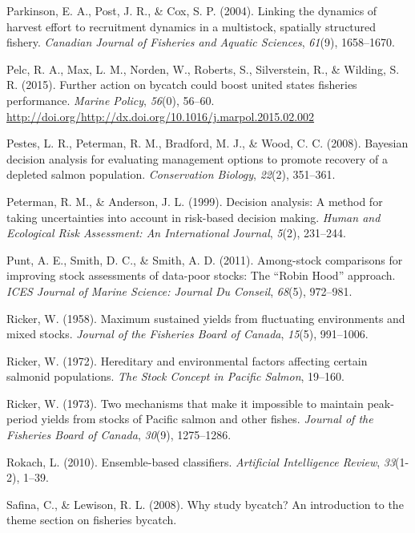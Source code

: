 \documentclass[12pt,]{scrartcl}
\begin{document}
\hypertarget{ref-parkinson2004linking}{}
Parkinson, E. A., Post, J. R., \& Cox, S. P. (2004). Linking the
dynamics of harvest effort to recruitment dynamics in a multistock,
spatially structured fishery. \emph{Canadian Journal of Fisheries and
Aquatic Sciences}, \emph{61}(9), 1658--1670.

\hypertarget{ref-Pelc201556}{}
Pelc, R. A., Max, L. M., Norden, W., Roberts, S., Silverstein, R., \&
Wilding, S. R. (2015). Further action on bycatch could boost united
states fisheries performance. \emph{Marine Policy}, \emph{56}(0),
56--60.
\url{http://doi.org/http://dx.doi.org/10.1016/j.marpol.2015.02.002}

\hypertarget{ref-pestes2008bayesian}{}
Pestes, L. R., Peterman, R. M., Bradford, M. J., \& Wood, C. C. (2008).
Bayesian decision analysis for evaluating management options to promote
recovery of a depleted salmon population. \emph{Conservation Biology},
\emph{22}(2), 351--361.

\hypertarget{ref-peterman1999decision}{}
Peterman, R. M., \& Anderson, J. L. (1999). Decision analysis: A method
for taking uncertainties into account in risk-based decision making.
\emph{Human and Ecological Risk Assessment: An International Journal},
\emph{5}(2), 231--244.

\hypertarget{ref-punt2011among}{}
Punt, A. E., Smith, D. C., \& Smith, A. D. (2011). Among-stock
comparisons for improving stock assessments of data-poor stocks: The
``Robin Hood'' approach. \emph{ICES Journal of Marine Science: Journal
Du Conseil}, \emph{68}(5), 972--981.

\hypertarget{ref-ricker1958maximum}{}
Ricker, W. (1958). Maximum sustained yields from fluctuating
environments and mixed stocks. \emph{Journal of the Fisheries Board of
Canada}, \emph{15}(5), 991--1006.

\hypertarget{ref-ricker1972hereditary}{}
Ricker, W. (1972). Hereditary and environmental factors affecting
certain salmonid populations. \emph{The Stock Concept in Pacific
Salmon}, 19--160.

\hypertarget{ref-ricker1973two}{}
Ricker, W. (1973). Two mechanisms that make it impossible to maintain
peak-period yields from stocks of Pacific salmon and other fishes.
\emph{Journal of the Fisheries Board of Canada}, \emph{30}(9),
1275--1286.

\hypertarget{ref-rokach2010ensemble}{}
Rokach, L. (2010). Ensemble-based classifiers. \emph{Artificial
Intelligence Review}, \emph{33}(1-2), 1--39.

\hypertarget{ref-safina2008study}{}
Safina, C., \& Lewison, R. L. (2008). Why study bycatch? An introduction
to the theme section on fisheries bycatch.
\end{document}
